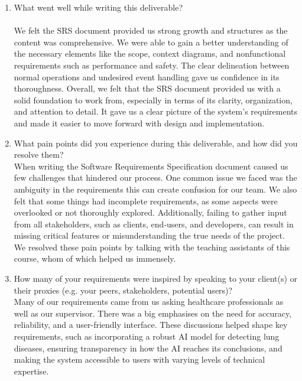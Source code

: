 \documentclass[12pt]{article}
\begin{document}
\begin{enumerate}
  \item What went well while writing this deliverable? \\\\
We felt the SRS document provided us strong growth and structures as the content was comprehensive. We were able to gain a better understanding of the necessary elements like the scope, context diagrams, and nonfunctional requirements such as performance and safety. The clear delineation between normal operations and undesired event handling gave us confidence in its thoroughness. Overall, we felt that the SRS document provided us with a solid foundation to work from, especially in terms of its clarity, organization, and attention to detail. It gave us a clear picture of the system's requirements and made it easier to move forward with design and implementation.


  \item What pain points did you experience during this deliverable, and how did
  you resolve them? \\

When writing the Software Requirements Specification document caused us few challenges that hindered our process. One common issue we faced was the ambiguity in the requirements this can create confusion for our team. We also felt that some things had incomplete requirements, as some aspects were overlooked or not thoroughly explored. Additionally, failing to gather input from all stakeholders, such as clients, end-users, and developers, can result in missing critical features or misunderstanding the true needs of the project. We resolved these pain points by talking with the teaching assistants of this course, whom of which helped us immensely.  


  \item How many of your requirements were inspired by speaking to your
  client(s) or their proxies (e.g. your peers, stakeholders, potential users)? \\
  
Many of our requirements came from us asking healthcare professionals as well as our supervisor. There was a big emphasises on the need for accuracy, reliability, and a user-friendly interface. These discussions helped shape key requirements, such as incorporating a robust AI model for detecting lung diseases, ensuring transparency in how the AI reaches its conclusions, and making the system accessible to users with varying levels of technical expertise.
      

\end{enumerate}
\end{document}
